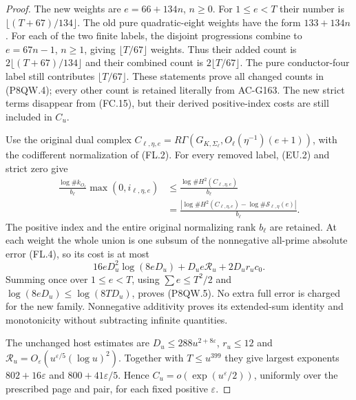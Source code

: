 \begin{proof}
The new weights are $e=66+134n$, $n\geq0$.
For $1\leq e<T$ their number is $\lfloor(T+67)/134\rfloor$.
The old pure quadratic-eight weights have the form $133+134n$.
For each of the two finite labels, the disjoint progressions combine
to $e=67n-1$, $n\geq1$, giving $\lfloor T/67\rfloor$ weights.
Thus their added count is $2\lfloor(T+67)/134\rfloor$ and
their combined count is $2\lfloor T/67\rfloor$.
The pure conductor-four label still contributes $\lfloor T/67\rfloor$.
These statements prove all changed counts in (P8QW.4);
every other count is retained literally from AC-G163.
The new strict terms disappear from (FC.15), but their derived
positive-index costs are still included in $C_u$.

Use the original dual complex
$C_{\ell,\eta,e}=R\Gamma(G_{K,\Sigma_\ell},
O_\ell(\eta^{-1})(e+1))$, with the codifferent normalization
of (FL.2).  For every removed label, (EU.2) and strict zero give
\[
 \begin{aligned}
 \frac{\log\#k_{O_\ell}}{b_\ell}\max(0,i_{\ell,\eta,e})
 &\leq\frac{\log\#H^2(C_{\ell,\eta,e})}{b_\ell}\\
 &=\frac{|\log\#H^2(C_{\ell,\eta,e})
                  -\log\#\mathcal S_{\ell,\eta}(e)|}{b_\ell}.
 \end{aligned}
 \tag{P8QW.7}
\]
The positive index and the entire original normalizing rank
$b_\ell$ are retained.  At each weight the whole union is one
subsum of the nonnegative all-prime absolute error (FL.4),
so its cost is at most
\[
                  16eD_u^2\log(8eD_u)+D_ue\mathcal R_u+2D_ur_uc_0.
 \tag{P8QW.8}
\]
Summing once over $1\leq e<T$, using $\sum e\leq T^2/2$
and $\log(8eD_u)\leq\log(8TD_u)$, proves (P8QW.5).
No extra full error is charged for the new family.
Nonnegative additivity proves its extended-sum identity and
monotonicity without subtracting infinite quantities.

The unchanged host estimates are $D_u\leq288u^{2+8\varepsilon}$,
$r_u\leq12$ and
$\mathcal R_u=O_\varepsilon(u^{\varepsilon/5}(\log u)^2)$.
Together with $T\leq u^{399}$ they give largest exponents
$802+16\varepsilon$ and $800+41\varepsilon/5$.
Hence $C_u=o(\exp(u^\varepsilon/2))$, uniformly over the
prescribed page and pair, for each fixed positive $\varepsilon$.


\end{proof}
